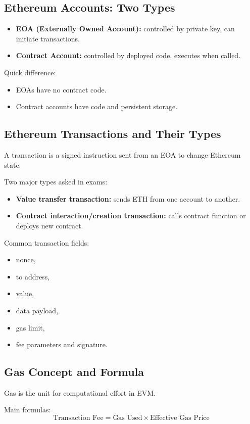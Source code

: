\documentclass[12pt,a4paper]{article}
\begin{document}
\subsection{Ethereum Accounts: Two Types}
\begin{itemize}
\item \textbf{EOA (Externally Owned Account):} controlled by private key, can initiate transactions.
\item \textbf{Contract Account:} controlled by deployed code, executes when called.
\end{itemize}

Quick difference:
\begin{itemize}
\item EOAs have no contract code.
\item Contract accounts have code and persistent storage.
\end{itemize}

\subsection{Ethereum Transactions and Their Types}
A transaction is a signed instruction sent from an EOA to change Ethereum state.

Two major types asked in exams:
\begin{itemize}
\item \textbf{Value transfer transaction:} sends ETH from one account to another.
\item \textbf{Contract interaction/creation transaction:} calls contract function or deploys new contract.
\end{itemize}

Common transaction fields:
\begin{itemize}
\item nonce,
\item to address,
\item value,
\item data payload,
\item gas limit,
\item fee parameters and signature.
\end{itemize}

\subsection{Gas Concept and Formula}
Gas is the unit for computational effort in EVM.

Main formulas:
\[
\text{Transaction Fee} = \text{Gas Used} \times \text{Effective Gas Price}
\]
\end{document}
